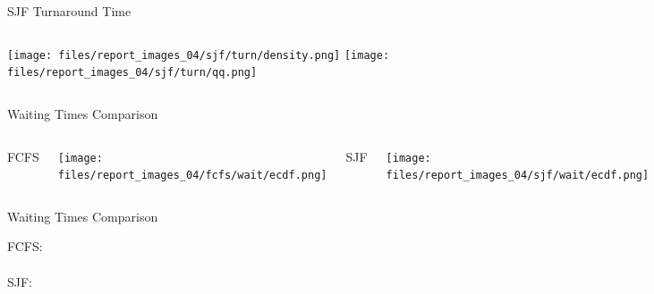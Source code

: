 \documentclass[aspectratio=169,xcolor=dvipsnames]{beamer}
\begin{document}

\begin{frame}{SJF Turnaround Time}
    \begin{columns}[c]
        \texttt{[image: files/report\_images\_04/sjf/turn/density.png]}
        \texttt{[image: files/report\_images\_04/sjf/turn/qq.png]}
    \end{columns}
\end{frame}


\begin{frame}{Waiting Times Comparison}
    \vspace{-1em}
    \begin{columns}[c]
        \begin{center}
            FCFS
        \end{center}
        \vspace{-0.8em}
        \texttt{[image: files/report\_images\_04/fcfs/wait/ecdf.png]}
        \begin{center}
            SJF
        \end{center}
        \vspace{-0.8em}
        \texttt{[image: files/report\_images\_04/sjf/wait/ecdf.png]}
    \end{columns}
\end{frame}


\begin{frame}{Waiting Times Comparison}
    \begin{center}
        \ssmall
        FCFS:\\
        \vspace{1em}
        \\
        \vspace{1em}
        SJF:\\
        \vspace{1em}
        \\
    \end{center}
\end{frame}

\end{document}
